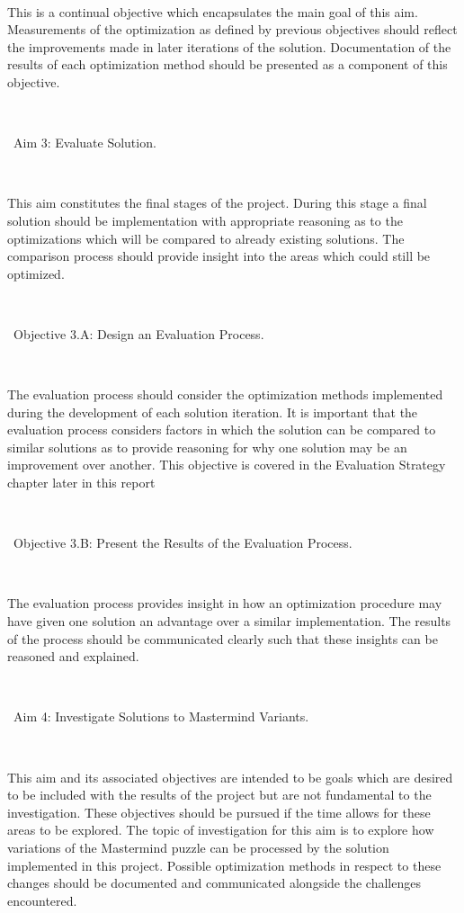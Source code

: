 \documentclass[12pt]{article}  %
\theoremstyle{definition}
\theoremstyle{remark}
\begin{document}
\

This is a continual objective which encapsulates the main goal of this aim. Measurements of the optimization as defined by previous 
objectives should reflect the improvements made in later iterations of the solution. Documentation of the results of each optimization 
method should be presented as a component of this objective.

\

\textbullet\ Aim 3: Evaluate Solution.

\

This aim constitutes the final stages of the project. During this stage a final solution should be implementation with appropriate reasoning 
as to the optimizations which will be compared to already existing solutions. The comparison process should provide insight into the 
areas which could still be optimized.

\

\textbullet\ Objective 3.A: Design an Evaluation Process.

\

The evaluation process should consider the optimization methods implemented during the development of each solution iteration. It is important 
that the evaluation process considers factors in which the solution can be compared to similar solutions as to provide reasoning for why one 
solution may be an improvement over another. This objective is covered in the Evaluation Strategy chapter later in this report

\

\textbullet\ Objective 3.B: Present the Results of the Evaluation Process.

\

The evaluation process provides insight in how an optimization procedure may have given one solution an advantage over a similar implementation. 
The results of the process should be communicated clearly such that these insights can be reasoned and explained.

\

\textbullet\ Aim 4: Investigate Solutions to Mastermind Variants.

\

This aim and its associated objectives are intended to be goals which are desired to be included with the results of the project but are not fundamental 
to the investigation. These objectives should be pursued if the time allows for these areas to be explored. The topic of investigation for this aim is to 
explore how variations of the Mastermind puzzle can be processed by the solution implemented in this project. Possible optimization methods in 
respect to these changes should be documented and communicated alongside the challenges encountered.
\end{document}
